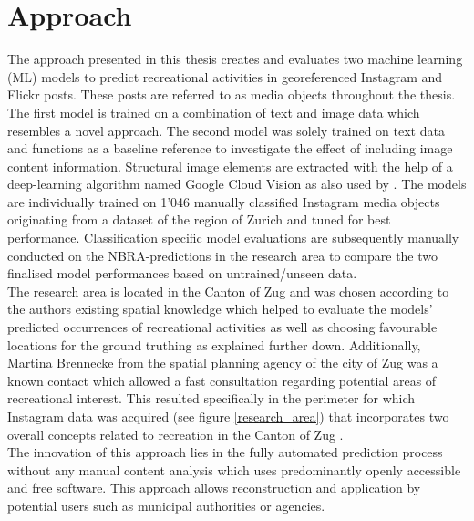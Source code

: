 \section{Approach}
The approach presented in this thesis creates and evaluates two machine learning (ML) models to predict recreational activities in georeferenced Instagram and Flickr posts. These posts are referred to as media objects throughout the thesis. The first model is trained on a combination of text and image data which resembles a novel approach. The second model was solely trained on text data and functions as a baseline reference to investigate the effect of including image content information. Structural image elements are extracted with the help of a deep-learning algorithm named Google Cloud Vision as also used by \textcite{Richards2018}. The models are individually trained on 1'046 manually classified Instagram media objects originating from a dataset of the region of Zurich \parencite{Gruzd2016} and tuned for best performance. Classification specific model evaluations are subsequently manually conducted on the NBRA-predictions in the research area to compare the two finalised model performances based on untrained/unseen data.\\

The research area is located in the Canton of Zug and was chosen according to the authors existing spatial knowledge which helped to evaluate the models' predicted occurrences of recreational activities as well as choosing favourable locations for the ground truthing as explained further down. Additionally, Martina Brennecke from the spatial planning agency of the city of Zug was a known contact which allowed a fast consultation regarding potential areas of recreational interest. This resulted specifically in the perimeter for which Instagram data was acquired (see figure \ref{research_area}) that incorporates two overall concepts related to recreation in the Canton of Zug \parencite{BaudirektiondesKantonsZug2012, Berchtold2011}.\\

The innovation of this approach lies in the fully automated prediction process without any manual content analysis which uses predominantly openly accessible and free software. This approach allows reconstruction and application by potential users such as municipal authorities or agencies. \\

